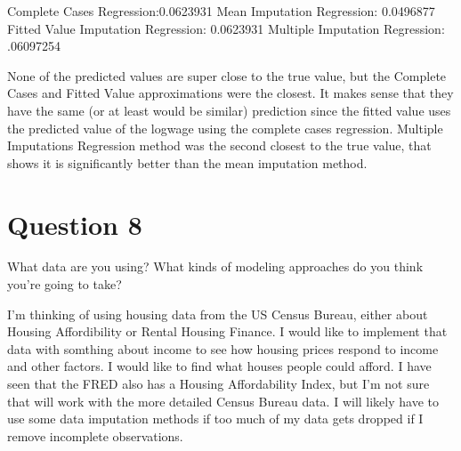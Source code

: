 \documentclass{article}
\begin{document}
Complete Cases Regression:0.0623931
Mean Imputation Regression: 0.0496877
Fitted Value Imputation Regression: 0.0623931
Multiple Imputation Regression: .06097254 

None of the predicted values are super close to the true value, but the Complete Cases and Fitted Value approximations were the closest. It makes sense that they have the same (or at least would be similar) prediction since the fitted value uses the predicted value of the logwage using the complete cases regression. Multiple Imputations Regression method was the second closest to the true value, that shows it is significantly better than the mean imputation method. 


\section{Question 8}
What data are you using?
What kinds of modeling approaches do you think you’re going to take?

I'm thinking of using housing data from the US Census Bureau, either about Housing Affordibility or Rental Housing Finance. I would like to implement that data with somthing about income to see how housing prices respond to income and other factors. I would like to find what houses people could afford. I have seen that the FRED also has a Housing Affordability Index, but I'm not sure that will work with the more detailed Census Bureau data. I will likely have to use some data imputation methods if too much of my data gets dropped if I remove incomplete observations. 
\end{document}

